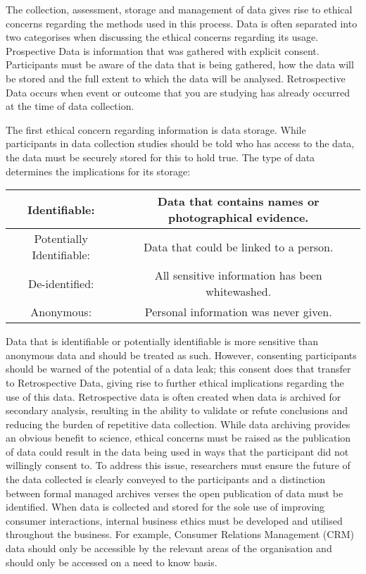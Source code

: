\documentclass{article}
\begin{document}
The collection, assessment, storage and management of data gives rise to ethical concerns regarding the methods used in this process. Data is often separated into two categorises when discussing the ethical concerns regarding its usage. Prospective Data is information that was gathered with explicit consent. Participants must be aware of the data that is being gathered, how the data will be stored and the full extent to which the data will be analysed. Retrospective Data occurs when event or outcome that you are studying has already occurred at the time of data collection. \newline

The first ethical concern regarding information is data storage. While participants in data collection studies should be told who has access to the data, the data must be securely stored for this to hold true. The type of data determines the implications for its storage: \newline

\begin{tabular}{||c c||} 
\hline
Identifiable: & Data that contains names or photographical evidence. \\ 
\hline
Potentially Identifiable: & Data that could be linked to a person. \\ 
\hline
De-identified: & All sensitive information has been whitewashed. \\
\hline
Anonymous: & Personal information was never given. \\
\hline
\end{tabular}\newline \newline

Data that is identifiable or potentially identifiable is more sensitive than anonymous data and should be treated as such. However, consenting participants should be warned of the potential of a data leak; this consent does that transfer to Retrospective Data, giving rise to further ethical implications regarding the use of this data. Retrospective data is often created when data is archived for secondary analysis, resulting in the ability to validate or refute conclusions and reducing the burden of repetitive data collection. While data archiving provides an obvious benefit to science, ethical concerns must be raised as the publication of data could result in the data being used in ways that the participant did not willingly consent to. To address this issue, researchers must ensure the future of the data collected is clearly conveyed to the participants and a distinction between formal managed archives verses the open publication of data must be identified. \cite{ethics} When data is collected and stored for the sole use of improving consumer interactions, internal business ethics must be developed and utilised throughout the business. For example, Consumer Relations Management (CRM) data should only be accessible by the relevant areas of the organisation and should only be accessed on a need to know basis. \newline
\end{document}
